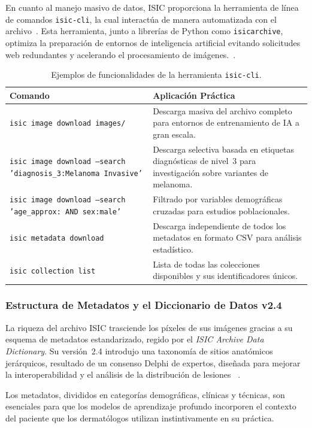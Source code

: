 En cuanto al manejo masivo de datos, ISIC proporciona la herramienta de línea de comandos \texttt{isic-cli}, 
la cual interactúa de manera automatizada con el archivo~\cite{isic_cli}. Esta herramienta, 
junto a librerías de Python como \texttt{isicarchive}, optimiza la preparación de entornos de inteligencia artificial 
evitando solicitudes web redundantes y acelerando el procesamiento de imágenes.~\cite{isic_pypi}.

\begin{table}[htbp]
\centering
\small
\caption{Ejemplos de funcionalidades de la herramienta \texttt{isic-cli}.}\label{tab:isic-cli}
\begin{tabular}{p{4.2cm}p{8.8cm}}
\toprule
\textbf{Comando} & \textbf{Aplicación Práctica} \\
\midrule
\texttt{isic image download images/} & Descarga masiva del archivo completo para entornos de entrenamiento de IA a gran escala. \\
\texttt{isic image download --search 'diagnosis\_3:Melanoma Invasive'} & Descarga selectiva basada en etiquetas diagnósticas de nivel~3 para investigación sobre variantes de melanoma. \\
\texttt{isic image download --search 'age\_approx: AND sex:male'} & Filtrado por variables demográficas cruzadas para estudios poblacionales. \\
\texttt{isic metadata download} & Descarga independiente de todos los metadatos en formato CSV para análisis estadístico. \\
\texttt{isic collection list} & Lista de todas las colecciones disponibles y sus identificadores únicos. \\
\bottomrule
\end{tabular}
\end{table}

\subsubsection{Estructura de Metadatos y el Diccionario de Datos v2.4}

La riqueza del archivo ISIC trasciende los píxeles de sus imágenes gracias a su esquema de metadatos estandarizado, 
regido por el \textit{ISIC Archive Data Dictionary}. Su versión~2.4 introdujo una taxonomía de sitios anatómicos 
jerárquicos, resultado de un consenso Delphi de expertos, diseñada para mejorar la interoperabilidad y el análisis de 
la distribución de lesiones ~\cite{isic_home}.

Los metadatos, divididos en categorías demográficas, clínicas y técnicas, son esenciales para que los modelos 
de aprendizaje profundo incorporen el contexto del paciente que los dermatólogos utilizan instintivamente en su 
práctica.


